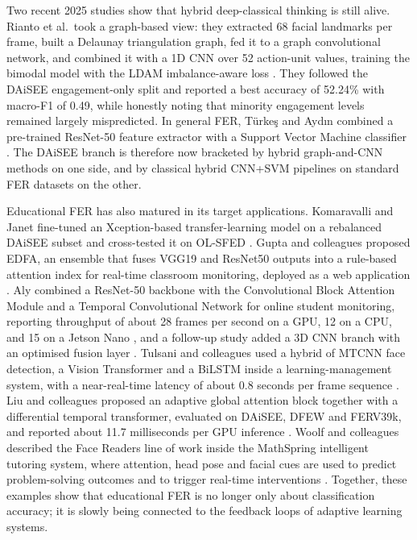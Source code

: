Two recent 2025 studies show that hybrid deep-classical thinking is still alive. Rianto et al.\ took a graph-based view: they extracted 68 facial landmarks per frame, built a Delaunay triangulation graph, fed it to a graph convolutional network, and combined it with a 1D \ac{CNN} over 52 action-unit values, training the bimodal model with the LDAM imbalance-aware loss \cite{rianto_engagement_2025}. They followed the \ac{DAiSEE} engagement-only split and reported a best accuracy of 52.24\% with macro-F1 of 0.49, while honestly noting that minority engagement levels remained largely mispredicted. In general \ac{FER}, Türkeş and Aydın combined a pre-trained ResNet-50 feature extractor with a Support Vector Machine classifier \cite{turkes_enhanced_2025}. The \ac{DAiSEE} branch is therefore now bracketed by hybrid graph-and-\ac{CNN} methods on one side, and by classical hybrid \ac{CNN}+\ac{SVM} pipelines on standard \ac{FER} datasets on the other.

Educational \ac{FER} has also matured in its target applications. Komaravalli and Janet fine-tuned an Xception-based transfer-learning model on a rebalanced \ac{DAiSEE} subset and cross-tested it on OL-SFED \cite{komaravalli_detecting_2023}. Gupta and colleagues proposed EDFA, an ensemble that fuses VGG19 and ResNet50 outputs into a rule-based attention index for real-time classroom monitoring, deployed as a web application \cite{gupta_edfa_2023}. Aly combined a ResNet-50 backbone with the Convolutional Block Attention Module and a Temporal Convolutional Network for online student monitoring, reporting throughput of about 28 frames per second on a GPU, 12 on a CPU, and 15 on a Jetson Nano \cite{aly_revolutionizing_2025}, and a follow-up study added a 3D \ac{CNN} branch with an optimised fusion layer \cite{aly_comprehensive_2025}. Tulsani and colleagues used a hybrid of \ac{MTCNN} face detection, a Vision Transformer and a \ac{BiLSTM} inside a learning-management system, with a near-real-time latency of about 0.8 seconds per frame sequence \cite{tulsani_realtime_2025}. Liu and colleagues proposed an adaptive global attention block together with a differential temporal transformer, evaluated on \ac{DAiSEE}, DFEW and FERV39k, and reported about 11.7 milliseconds per GPU inference \cite{liu_dynamic_2026}. Woolf and colleagues described the Face Readers line of work inside the MathSpring intelligent tutoring system, where attention, head pose and facial cues are used to predict problem-solving outcomes and to trigger real-time interventions \cite{woolf_face_2023}. Together, these examples show that educational \ac{FER} is no longer only about classification accuracy; it is slowly being connected to the feedback loops of adaptive learning systems.

